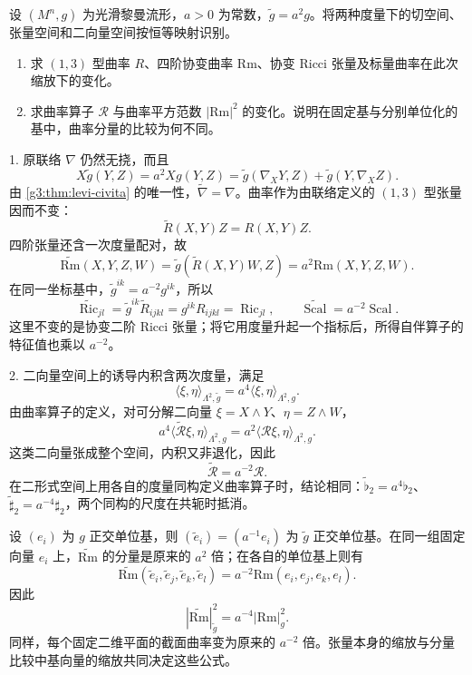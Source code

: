 \begin{exercise}\label{g3:ex:constant-metric-curvature-scaling}
	设 \((M^n,g)\) 为光滑黎曼流形，\(a>0\) 为常数，\(\widetilde g=a^2g\)。将两种度量下的切空间、张量空间和二向量空间按恒等映射识别。
	\begin{enumerate}
		\item 求 \((1,3)\) 型曲率 \(R\)、四阶协变曲率 \(\mathrm{Rm}\)、协变 Ricci 张量及标量曲率在此次缩放下的变化。
		\item 求曲率算子 \(\mathcal R\) 与曲率平方范数 \(|\mathrm{Rm}|^2\) 的变化。说明在固定基与分别单位化的基中，曲率分量的比较为何不同。
	\end{enumerate}
\end{exercise}
\begin{solution}
	1. 原联络 \(\nabla\) 仍然无挠，而且
	\[
		X\widetilde g(Y,Z)
		=a^2Xg(Y,Z)
		=\widetilde g(\nabla_XY,Z)+\widetilde g(Y,\nabla_XZ).
	\]
	由 \cref{g3:thm:levi-civita} 的唯一性，\(\widetilde\nabla=\nabla\)。曲率作为由联络定义的 \((1,3)\) 型张量因而不变：
	\[
		\widetilde R(X,Y)Z=R(X,Y)Z.
	\]
	四阶张量还含一次度量配对，故
	\[
		\widetilde{\mathrm{Rm}}(X,Y,Z,W)
		=\widetilde g(\widetilde R(X,Y)W,Z)
		=a^2\mathrm{Rm}(X,Y,Z,W).
	\]
	在同一坐标基中，\(\widetilde g^{ik}=a^{-2}g^{ik}\)，所以
	\[
		\widetilde{\operatorname{Ric}}_{jl}
		=\widetilde g^{ik}\widetilde R_{ijkl}
		=g^{ik}R_{ijkl}=\operatorname{Ric}_{jl},
		\qquad
		\widetilde{\operatorname{Scal}}
		=a^{-2}\operatorname{Scal}.
	\]
	这里不变的是协变二阶 Ricci 张量；将它用度量升起一个指标后，所得自伴算子的特征值也乘以 \(a^{-2}\)。

	2. 二向量空间上的诱导内积含两次度量，满足
	\[
		\langle\xi,\eta\rangle_{\Lambda^2,\widetilde g}
		=a^4\langle\xi,\eta\rangle_{\Lambda^2,g}.
	\]
	由曲率算子的定义，对可分解二向量 \(\xi=X\wedge Y\)、\(\eta=Z\wedge W\)，
	\[
		a^4\langle\widetilde{\mathcal R}\xi,\eta\rangle_{\Lambda^2,g}
		=a^2\langle\mathcal R\xi,\eta\rangle_{\Lambda^2,g}.
	\]
	这类二向量张成整个空间，内积又非退化，因此
	\[
		\widetilde{\mathcal R}=a^{-2}\mathcal R.
	\]
	在二形式空间上用各自的度量同构定义曲率算子时，结论相同：\(\widetilde\flat_2=a^4\flat_2\)、\(\widetilde\sharp_2=a^{-4}\sharp_2\)，两个同构的尺度在共轭时抵消。

	设 \((e_i)\) 为 \(g\) 正交单位基，则 \((\widetilde e_i)=(a^{-1}e_i)\) 为 \(\widetilde g\) 正交单位基。在同一组固定向量 \(e_i\) 上，\(\widetilde{\mathrm{Rm}}\) 的分量是原来的 \(a^2\) 倍；在各自的单位基上则有
	\[
		\widetilde{\mathrm{Rm}}
			(\widetilde e_i,\widetilde e_j,\widetilde e_k,\widetilde e_l)
		=a^{-2}\mathrm{Rm}(e_i,e_j,e_k,e_l).
	\]
	因此
	\[
		|\widetilde{\mathrm{Rm}}|_{\widetilde g}^2
		=a^{-4}|\mathrm{Rm}|_g^2.
	\]
	同样，每个固定二维平面的截面曲率变为原来的 \(a^{-2}\) 倍。张量本身的缩放与分量比较中基向量的缩放共同决定这些公式。
\end{solution}

